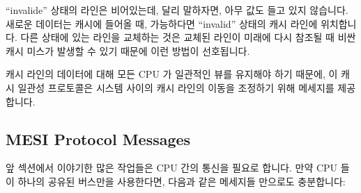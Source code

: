 ``invalide'' 상태의 라인은 비어있는데, 달리 말하자면, 아무 값도 들고 있지
않습니다.
새로운 데이터는 캐시에 들어올 때, 가능하다면 ``invalid'' 상태의 캐시 라인에
위치합니다.
다른 상태에 있는 라인을 교체하는 것은 교체된 라인이 미래에 다시 참조될 때 비싼
캐시 미스가 발생할 수 있기 때문에 이런 방법이 선호됩니다.

캐시 라인의 데이터에 대해 모든 CPU 가 일관적인 뷰를 유지해야 하기 때문에, 이
캐시 일관성 프로토콜은 시스템 사이의 캐시 라인의 이동을 조정하기 위해 메세지를
제공합니다.

\subsection{MESI Protocol Messages}
\label{sec:app:whymb:MESI Protocol Messages}

앞 섹션에서 이야기한 많은 작업들은 CPU 간의 통신을 필요로 합니다.
만약 CPU 들이 하나의 공유된 버스만을 사용한다면, 다음과 같은 메세지들 만으로도
충분합니다:
\iffalse

